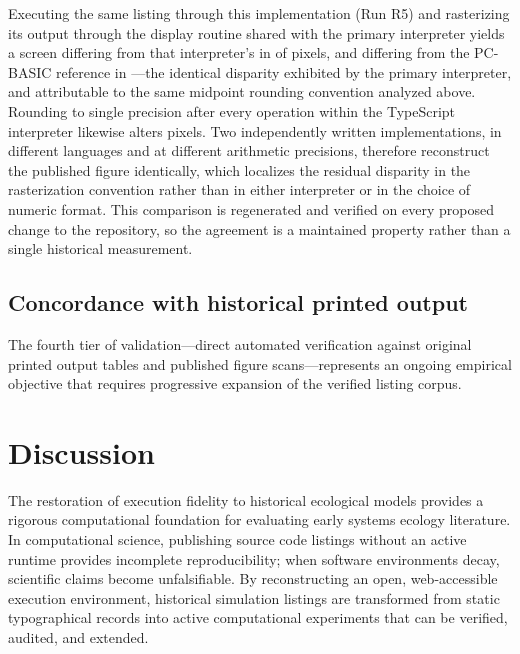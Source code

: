 \documentclass[3p,times,authoryear,twocolumn]{elsarticle}
\begin{document}
Executing the same listing through this implementation (Run R5) and rasterizing its output through the display routine shared with the primary interpreter yields a screen differing from that interpreter's in \oracleEnginesDiffering{} of \oracleScreenPixels{} pixels, and differing from the PC-BASIC reference in \oracleEngineScreenDiffering{}---the identical disparity exhibited by the primary interpreter, and attributable to the same midpoint rounding convention analyzed above. Rounding to single precision after every operation within the TypeScript interpreter likewise alters \oraclePrecisionsDiffering{} pixels. Two independently written implementations, in different languages and at different arithmetic precisions, therefore reconstruct the published figure identically, which localizes the residual disparity in the rasterization convention rather than in either interpreter or in the choice of numeric format. This comparison is regenerated and verified on every proposed change to the repository, so the agreement is a maintained property rather than a single historical measurement.

\subsection{Concordance with historical printed output}

The fourth tier of validation---direct automated verification against original printed output tables and published figure scans---represents an ongoing empirical objective that requires progressive expansion of the verified listing corpus.

\section{Discussion}
\label{sec:discussion}

The restoration of execution fidelity to historical ecological models provides a rigorous computational foundation for evaluating early systems ecology literature. In computational science, publishing source code listings without an active runtime provides incomplete reproducibility; when software environments decay, scientific claims become unfalsifiable. By reconstructing an open, web-accessible execution environment, historical simulation listings are transformed from static typographical records into active computational experiments that can be verified, audited, and extended.
\end{document}
